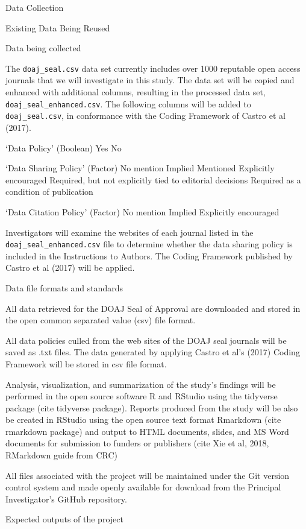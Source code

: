 \documentclass[ignorenonframetext,]{beamer}
\begin{document}
\begin{frame}[fragile]{Data Collection}
\begin{block}{Existing Data Being Reused}
\end{block}

\begin{block}{Data being collected}

The \texttt{doaj\_seal.csv} data set currently includes over 1000
reputable open access journals that we will investigate in this study.
The data set will be copied and enhanced with additional columns,
resulting in the processed data set, \texttt{doaj\_seal\_enhanced.csv}.
The following columns will be added to \texttt{doaj\_seal.csv}, in
conformance with the Coding Framework of Castro et al (2017).

`Data Policy' (Boolean) Yes No

`Data Sharing Policy' (Factor) No mention Implied Mentioned Explicitly
encouraged Required, but not explicitly tied to editorial decisions
Required as a condition of publication

`Data Citation Policy' (Factor) No mention Implied Explicitly encouraged

Investigators will examine the websites of each journal listed in the
\texttt{doaj\_seal\_enhanced.csv} file to determine whether the data
sharing policy is included in the Instructions to Authors. The Coding
Framework published by Castro et al (2017) will be applied.

Data file formats and standards

All data retrieved for the DOAJ Seal of Approval are downloaded and
stored in the open common separated value (csv) file format.

All data policies culled from the web sites of the DOAJ seal journals
will be saved as .txt files. The data generated by applying Castro et
al's (2017) Coding Framework will be stored in csv file format.

Analysis, visualization, and summarization of the study's findings will
be performed in the open source software R and RStudio using the
tidyverse package (cite tidyverse package). Reports produced from the
study will be also be created in RStudio using the open source text
format Rmarkdown (cite rmarkdown package) and output to HTML documents,
slides, and MS Word documents for submission to funders or publishers
(cite Xie et al, 2018, RMarkdown guide from CRC)

All files associated with the project will be maintained under the Git
version control system and made openly available for download from the
Principal Investigator's GitHub repository.

\begin{block}{Expected outputs of the project}


\end{block}
\end{block}
\end{frame}
\end{document}
